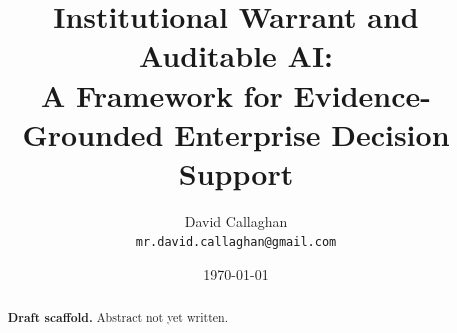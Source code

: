 \documentclass[11pt]{article}
\title{Institutional Warrant and Auditable AI:\\ A Framework for Evidence-Grounded
       Enterprise Decision Support}
\author{%
  David Callaghan\\
  \texttt{mr.david.callaghan@gmail.com}
}
\date{\today}
\begin{document}
\maketitle

\begin{abstract}
\textbf{Draft scaffold.} Abstract not yet written.
\end{abstract}











%
% 
% 
\end{document}
